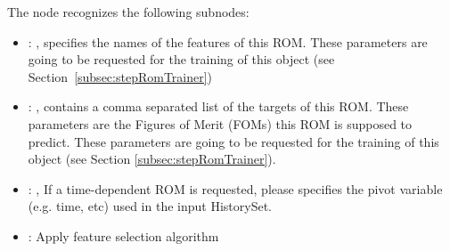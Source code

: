   The  node recognizes the following subnodes:
  \begin{itemize}
    \item {}: , 
      specifies the names of the features of this ROM.         \nb These parameters are going to be
      requested for the training of this object         (see Section~\ref{subsec:stepRomTrainer})

    \item {}: , 
      contains a comma separated list of the targets of this ROM. These parameters         are the
      Figures of Merit (FOMs) this ROM is supposed to predict.         \nb These parameters are
      going to be requested for the training of this         object (see Section
      \ref{subsec:stepRomTrainer}).

    \item {}: , 
      If a time-dependent ROM is requested, please specifies the pivot         variable (e.g. time,
      etc) used in the input HistorySet.

    \item {}:
      Apply feature selection algorithm


\end{itemize}
